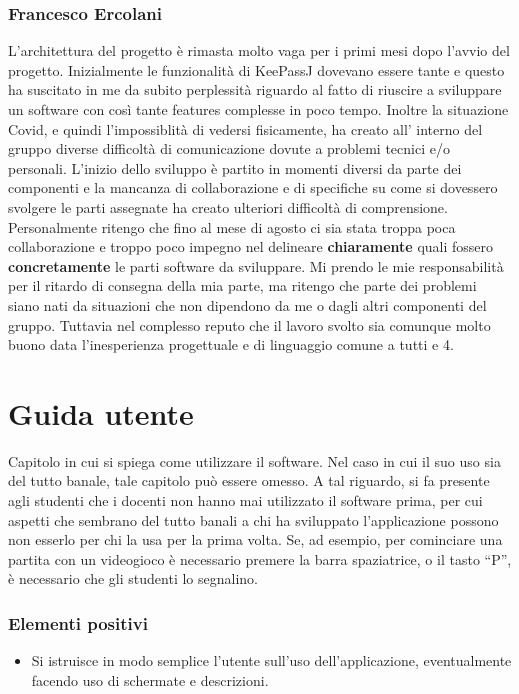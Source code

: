 \documentclass[a4paper,12pt]{report}
\begin{document}
\subsection*{Francesco Ercolani}
L'architettura del progetto è rimasta molto vaga per i primi mesi dopo l'avvio del progetto. 
Inizialmente le funzionalità di KeePassJ dovevano essere tante e questo ha suscitato in me 
da subito perplessità riguardo al fatto di riuscire a sviluppare un software con così tante 
features complesse in poco tempo.
Inoltre la situazione Covid, e quindi l'impossiblità di vedersi fisicamente, ha creato all'
interno del gruppo diverse difficoltà di comunicazione dovute a problemi tecnici e/o personali.
L'inizio dello sviluppo è partito in momenti diversi da parte dei componenti e la mancanza di 
collaborazione e di specifiche su come si dovessero svolgere le parti assegnate ha creato ulteriori difficoltà di comprensione.
Personalmente ritengo che fino al mese di agosto ci sia stata troppa poca collaborazione e 
troppo poco impegno nel delineare \textbf{chiaramente} quali fossero \textbf{concretamente} 
le parti software da sviluppare.
Mi prendo le mie responsabilità per il ritardo di consegna della mia parte, ma ritengo che 
parte dei problemi siano nati da situazioni che non dipendono da me o dagli altri componenti del gruppo.
Tuttavia nel complesso reputo che il lavoro svolto sia comunque molto buono data 
l'inesperienza progettuale e di linguaggio comune a tutti e 4.

\appendix
\chapter{Guida utente}

Capitolo in cui si spiega come utilizzare il software. Nel caso in cui il suo uso sia del tutto 
banale, tale capitolo può essere omesso.
%
A tal riguardo, si fa presente agli studenti che i docenti non hanno mai utilizzato il software 
prima, per cui aspetti che sembrano del tutto banali a chi ha sviluppato l'applicazione possono non 
esserlo per chi la usa per la prima volta.
%
Se, ad esempio, per cominciare una partita con un videogioco è necessario premere la barra 
spaziatrice, o il tasto ``P'', è necessario che gli studenti lo segnalino.

\subsection*{Elementi positivi}

\begin{itemize}
 \item Si istruisce in modo semplice l'utente sull'uso dell'applicazione, eventualmente facendo uso di schermate e descrizioni.
\end{itemize}
\end{document}
